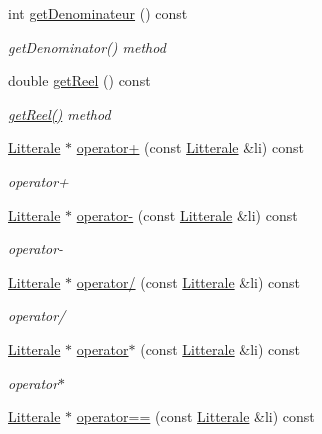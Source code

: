 \begin{DoxyCompactItemize}
int \hyperlink{class_li_expression_ab0c4fc0767e78b313d2ac4741bc9a8e7}{get\+Denominateur} () const 
\begin{DoxyCompactList}\small\item\em get\+Denominator() method \end{DoxyCompactList}\item 
double \hyperlink{class_li_expression_a6810603f331aa6a054df4e4d9f64ba4a}{get\+Reel} () const 
\begin{DoxyCompactList}\small\item\em \hyperlink{class_li_expression_a6810603f331aa6a054df4e4d9f64ba4a}{get\+Reel()} method \end{DoxyCompactList}\item 
\hyperlink{class_litterale}{Litterale} $\ast$ \hyperlink{class_li_expression_aba0fbbab32512bad7e67aa23d2e50318}{operator+} (const \hyperlink{class_litterale}{Litterale} \&li) const 
\begin{DoxyCompactList}\small\item\em operator+ \end{DoxyCompactList}\item 
\hyperlink{class_litterale}{Litterale} $\ast$ \hyperlink{class_li_expression_a459ed09d7f610ff88e606fc95e0b22a5}{operator-\/} (const \hyperlink{class_litterale}{Litterale} \&li) const 
\begin{DoxyCompactList}\small\item\em operator-\/ \end{DoxyCompactList}\item 
\hyperlink{class_litterale}{Litterale} $\ast$ \hyperlink{class_li_expression_a6d6c07034ea7c50301164e27d1af48fc}{operator/} (const \hyperlink{class_litterale}{Litterale} \&li) const 
\begin{DoxyCompactList}\small\item\em operator/ \end{DoxyCompactList}\item 
\hyperlink{class_litterale}{Litterale} $\ast$ \hyperlink{class_li_expression_a14d8c244f1d0a5035781e999220f6972}{operator$\ast$} (const \hyperlink{class_litterale}{Litterale} \&li) const 
\begin{DoxyCompactList}\small\item\em operator$\ast$ \end{DoxyCompactList}\item 
\hyperlink{class_litterale}{Litterale} $\ast$ \hyperlink{class_li_expression_a30334b98ebe99c3b06596b964b74aa2b}{operator==} (const \hyperlink{class_litterale}{Litterale} \&li) const 

\end{DoxyCompactItemize}
